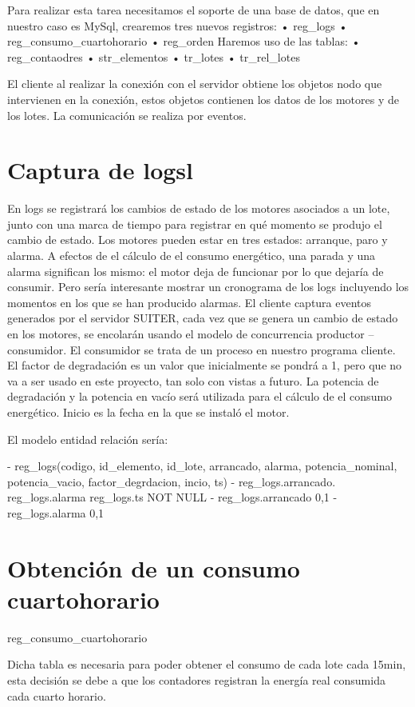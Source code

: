 Para realizar esta tarea necesitamos el soporte de una base de datos,
 que en nuestro caso es MySql, crearemos tres nuevos registros:
•	reg_logs
•	reg_consumo_cuartohorario
•	reg_orden
Haremos uso de las tablas:
•	reg_contaodres
•	str_elementos
•	tr_lotes
•	tr_rel_lotes

El cliente al realizar la conexión con el servidor obtiene los objetos nodo que intervienen en la 
conexión, estos objetos contienen los datos de los motores y de los lotes. La comunicación se 
realiza por eventos.

\section*{Captura de logsl}

En logs se registrará los cambios de estado de los motores asociados a un lote, junto con 
una marca de tiempo para registrar en qué momento se produjo el cambio de estado. Los motores
 pueden estar en tres estados: arranque, paro y alarma. A efectos de el cálculo de el consumo
 energético, una parada y una alarma significan los mismo: el motor deja de funcionar por lo que 
dejaría de consumir. Pero sería interesante mostrar un cronograma de los logs incluyendo los 
momentos en los que se han producido alarmas. El cliente captura eventos generados por el
servidor SUITER, cada vez que se genera un cambio de estado en los motores, se encolarán
 usando el modelo de concurrencia productor – consumidor. El consumidor se trata de un proceso
 en nuestro programa cliente. El factor de degradación es un valor que inicialmente se pondrá
 a 1, pero que no va a ser usado en este proyecto, tan solo con vistas a futuro. La potencia 
de degradación y la potencia en vacío será utilizada para el cálculo de el consumo energético. 
Inicio es la fecha en la que se instaló el motor.

El modelo entidad relación sería:

-	reg_logs(codigo, id_elemento, id_lote, arrancado, alarma, potencia_nominal, potencia_vacio, factor_degrdacion, incio, ts)
-	reg_logs.arrancado. reg_logs.alarma reg_logs.ts NOT NULL
-	reg_logs.arrancado {0,1}
-	reg_logs.alarma {0,1}

\section*{Obtención de un consumo cuartohorario}

reg_consumo_cuartohorario

Dicha tabla es necesaria para poder obtener el consumo de cada lote cada 15min, esta 
decisión se debe a que los contadores registran la energía real consumida cada cuarto horario.

